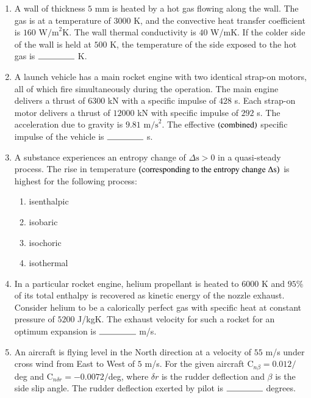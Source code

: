 \documentclass[journal,12pt,onecolumn]{IEEEtran}
\theoremstyle{remark}
\begin{document}
\begin{enumerate}[start=40]
	\item A wall of thickness $5$ mm is heated by a hot gas flowing along the wall. The gas is at a temperature of $3000$ K, and the convective heat transfer coefficient is $160$ $\text{W/m}^2$K. The wall thermal conductivity is $40$ W/mK. If the colder side of the wall is held at $500$ K, the temperature of the side exposed to the hot gas is $\rule{1.5cm}{0.4pt}$ K.\\
		
	\item A launch vehicle has a main rocket engine with two identical strap-on motors, all of which fire simultaneously during the operation. The main engine delivers a thrust of $6300$ kN with a specific impulse of $428$ s. Each strap-on motor delivers a thrust of $12000$ kN with specific impulse of $292$ s. The acceleration due to gravity is $9.81$ $\text{m/s}^2$. The effective $\left(\text{combined}\right)$ specific impulse of the vehicle is $\rule{1.5cm}{0.4pt}$ s.\\
		
	\item A substance experiences an entropy change of $\Delta \text{s} > 0$ in a quasi-steady process. The rise in temperature $\left(\text{corresponding to the entropy change $\Delta$s}\right)$ is highest for the following process:
		\begin{enumerate}
			\item isenthalpic
			\item isobaric
			\item isochoric
			\item isothermal\\
		\end{enumerate}
		
	\item In a particular rocket engine, helium propellant is heated to $6000$ K and $95\%$ of its total enthalpy is recovered as kinetic energy of the nozzle exhaust. Consider helium to be a calorically perfect gas with specific heat at constant pressure of $5200$ J/kgK. The exhaust velocity for such a rocket for an optimum expansion is $\rule{1.5cm}{0.4pt}$ m/s.\\
		
	\item An aircraft is flying level in the North direction at a velocity of $55$ m/s under cross wind from East to West of $5$ m/s. For the given aircraft $\text{C}_{n\beta} = 0.012/$deg and $\text{C}_{n\delta r} = -0.0072/$deg, where $\delta r$ is the rudder deflection and $\beta$ is the side slip angle. The rudder deflection exerted by pilot is $\rule{1.5cm}{0.4pt}$ degrees.\\
		

\end{enumerate}
\end{document}
